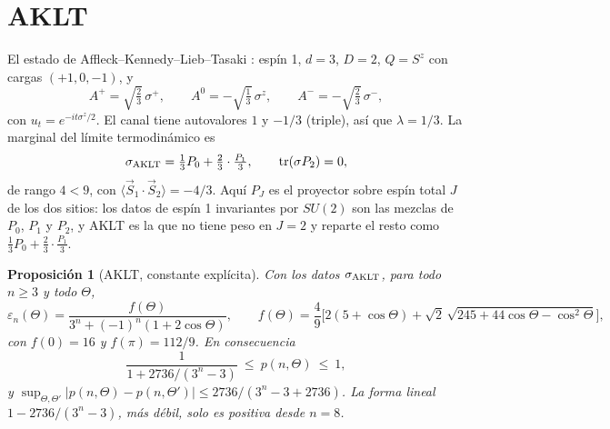 \documentclass[11pt,a4paper]{article}
\newtheorem{proposicion}[teorema]{Proposición}
\theoremstyle{remark}
\newcommand{\tr}{\operatorname{tr}}
\newcommand{\ev}[1]{\langle #1\rangle}
\begin{document}
\section{AKLT}\label{sec:aklt}

El estado de Affleck--Kennedy--Lieb--Tasaki \cite{aklt}: espín 1, $d=3$, $D=2$, $Q=S^z$ con cargas $(+1,0,-1)$, y
\[
  A^{+}=\sqrt{\tfrac23}\,\sigma^+,\qquad A^0=-\sqrt{\tfrac13}\,\sigma^z,\qquad A^{-}=-\sqrt{\tfrac23}\,\sigma^-,
\]
con $u_t=e^{-it\sigma^z/2}$. El canal tiene autovalores $1$ y $-1/3$ (triple), así que
$\lambda=1/3$. La marginal del límite termodinámico es
\[
  \sigma_{\rm AKLT}=\tfrac13P_0+\tfrac23\cdot\tfrac{P_1}3,\qquad \tr(\sigma P_2)=0,
\]
de rango $4<9$, con $\ev{\vec S_1\cdot\vec S_2}=-4/3$. Aquí $P_J$ es el proyector sobre espín total
$J$ de los dos sitios: los datos de espín 1 invariantes por $SU(2)$ son las mezclas de $P_0$, $P_1$ y
$P_2$, y AKLT es la que no tiene peso en $J=2$ y reparte el resto como $\tfrac13P_0+\tfrac23\cdot\tfrac{P_1}3$.

\begin{proposicion}[AKLT, constante explícita]\label{prop:aklt}
Con los datos $\sigma_{\rm AKLT}$, para todo $n\ge3$ y todo $\Theta$,
\[
  \varepsilon_n(\Theta)=\frac{f(\Theta)}{3^n+(-1)^n(1+2\cos\Theta)},\qquad
  f(\Theta)=\frac49\Big[2(5+\cos\Theta)+\sqrt2\,\sqrt{245+44\cos\Theta-\cos^2\Theta}\Big],
\]
con $f(0)=16$ y $f(\pi)=112/9$. En consecuencia
\[
  \frac1{1+2736/(3^n-3)}\ \le\ p(n,\Theta)\ \le\ 1,
\]
y $\sup_{\Theta,\Theta'}|p(n,\Theta)-p(n,\Theta')|\le2736/(3^n-3+2736)$. La forma lineal
$1-2736/(3^n-3)$, más débil, solo es positiva desde $n=8$.
\end{proposicion}
\end{document}
